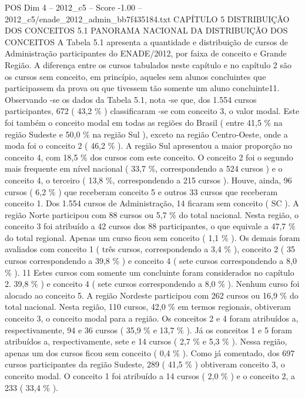 \begin{textsample}{POS Dim 4 – 2012\_c5 – Score -1.00 – 2012\_c5/enade\_2012\_admin\_bb7f435184.txt}  \label{ex:f4_pos_249}
CAPÍTULO 5 DISTRIBUIÇÃO DOS CONCEITOS 5.1 PANORAMA NACIONAL DA DISTRIBUIÇÃO DOS CONCEITOS A Tabela 5.1 apresenta a quantidade e distribuição de cursos de Administração participantes do ENADE/2012, por faixa de conceito e Grande Região.
A diferença entre os cursos tabulados neste capítulo e no capítulo 2 são os cursos sem conceito, em princípio, aqueles sem alunos concluintes que participassem da prova ou que tivessem tão somente um aluno concluinte11.
Observando -se os dados da Tabela 5.1, nota -se que, dos 1.554 cursos participantes, 672 ( 43,2 \% ) classificaram -se com conceito 3, o valor modal.
Este foi também o conceito modal em todas as regiões do Brasil ( entre 41,5 \% na região Sudeste e 50,0 \% na região Sul ), exceto na região Centro-Oeste, onde a moda foi o conceito 2 ( 46,2 \% ).
A região Sul apresentou a maior proporção no conceito 4, com 18,5 \% dos cursos com este conceito.
O conceito 2 foi o segundo mais frequente em nível nacional ( 33,7 \%, correspondendo a 524 cursos ) e o conceito 4, o terceiro ( 13,8 \%, correspondendo a 215 cursos ).
Houve, ainda, 96 cursos ( 6,2 \% ) que receberam conceito 5 e outros 33 cursos que receberam conceito 1.
Dos 1.554 cursos de Administração, 14 ficaram sem conceito ( SC ).
A região Norte participou com 88 cursos ou 5,7 \% do total nacional.
Nesta região, o conceito 3 foi atribuído a 42 cursos dos 88 participantes, o que equivale a 47,7 \% do total regional.
Apenas um curso ficou sem conceito ( 1,1 \% ).
Os demais foram avaliados com conceito 1 ( três cursos, correspondendo a 3,4 \% ), conceito 2 ( 35 cursos correspondendo a 39,8 \% ) e conceito 4 ( sete cursos correspondendo a 8,0 \% ). 11 Estes cursos com somente um concluinte foram considerados no capítulo 2. 39,8 \% ) e conceito 4 ( sete cursos correspondendo a 8,0 \% ).
Nenhum curso foi alocado ao conceito 5.
A região Nordeste participou com 262 cursos ou 16,9 \% do total nacional.
Nesta região, 110 cursos, 42,0 \% em termos regionais, obtiveram conceito 3, o conceito modal para a região.
Os conceitos 2 e 4 foram atribuídos a, respectivamente, 94 e 36 cursos ( 35,9 \% e 13,7 \% ).
Já os conceitos 1 e 5 foram atribuídos a, respectivamente, sete e 14 cursos ( 2,7 \% e 5,3 \% ).
Nessa região, apenas um dos cursos ficou sem conceito ( 0,4 \% ).
Como já comentado, dos 697 cursos participantes da região Sudeste, 289 ( 41,5 \% ) obtiveram conceito 3, o conceito modal.
O conceito 1 foi atribuído a 14 cursos ( 2,0 \% ) e o conceito 2, a 233 ( 33,4 \% ).

\end{textsample}
